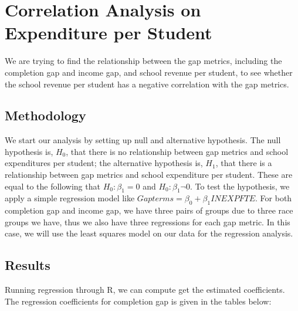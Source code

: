 \documentclass{article}
\begin{document}

\section{Correlation Analysis on Expenditure per Student}

We are trying to find the relationship between the gap metrics, including the completion gap and income gap,  and school revenue per student, to see whether the school revenue per student has a negative correlation with the gap metrics. 

\subsection{Methodology}

We start our analysis by setting up null and alternative hypothesis. The null hypothesis is, $H_{0}$, that there is no relationship between gap metrics and school expenditures per student; the alternative hypothesis is, $H_{1}$, that there is a relationship between gap metrics and school expenditure per student. These are equal to the following that $H_{0}: \beta_1 = 0$ and $H_{0}: \beta_1 \neg 0$. To test the hypothesis, we apply a simple regression model like $Gapterms= \beta_0 + \beta_1 INEXPFTE$. For both completion gap and income gap, we have three pairs of groups due to three race groups we have, thus we also have three regressions for each gap metric. In this case, we will use the least squares model on our data for the regression analysis. 


\subsection{Results}

Running regression through R, we can compute get the estimated coefficients. The regression coefficients for completion gap is given in the tables below:
\end{document}
